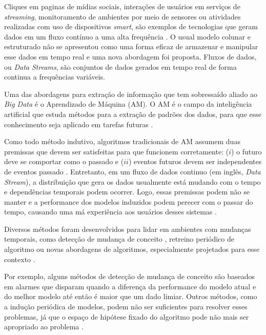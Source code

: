 Cliques em paginas de mídias sociais, interações de usuários em serviços de
\textit{streaming}, monitoramento de ambientes por meio de sensores ou
atividades realizadas com uso de dispositivos \textit{smart}, são exemplos de
tecnologias que geram dados em um fluxo contínuo a uma alta frequência
\cite{gama2004learning}. O usual modelo colunar e estruturado não se apresentou
como uma forma eficaz de armazenar e manipular esse dados em tempo real
\cite{gama2007learning} e uma nova abordagem foi proposta. Fluxos de dados, ou
\textit{Data Streams}, são conjuntos de dados gerados em tempo real de forma
continua a frequências variáveis.



Uma das abordagens para extração de informação que tem sobressaído aliado ao
\textit{Big Data} é o Aprendizado de Máquina (AM). O AM é o campo da
inteligência artificial que estuda métodos para a extração de padrões dos
dados, para que esse conhecimento seja aplicado em tarefas futuras
\cite{mitchell1997machine,friedman2001elements}.

Como todo método indutivo, algoritmos tradicionais de AM assumem duas premissas
que devem ser satisfeitas para que funcionem corretamente: ($i$) o futuro deve
se comportar como o passado e ($ii$) eventos futuros devem ser independentes de
eventos passado \cite{vapnik2013nature}. Entretanto, em um fluxo de dados
continuo (em inglês, \textit{Data Stream}), a distribuição que gera os dados
usualmente está mudando com o tempo e dependências temporais podem ocorrer.
Logo, essas premissas podem não se manter e a performance dos modelos induzidos
podem perecer com o passar do tempo, causando uma má experiência aos usuários
desses sistemas  \cite{gama2007learning, Johansson2014}.

Diversos métodos foram desenvolvidos para lidar em ambientes com mudanças
temporais, como detecção de mudança de conceito
\cite{klinkenberg2000detecting}, retreino periódico de algoritmo
\cite{bifet2007learning} ou novas abordagens de algoritmos, especialmente
projetados para esse contexto \cite{zang2014comparative}.

Por exemplo, alguns métodos de detecção de mudança de conceito
\cite{gama2010knowledge} são baseados em alarmes que disparam quando a
diferença da performance do modelo atual e do melhor modelo até então é maior
que um dado limiar. Outros métodos, como a indução periódica de modelos, podem
não ser suficientes para resolver esses problemas, já que o espaço de hipótese
fixado do algoritmo pode não mais ser apropriado ao problema
\cite{rossi2014metastream}.

